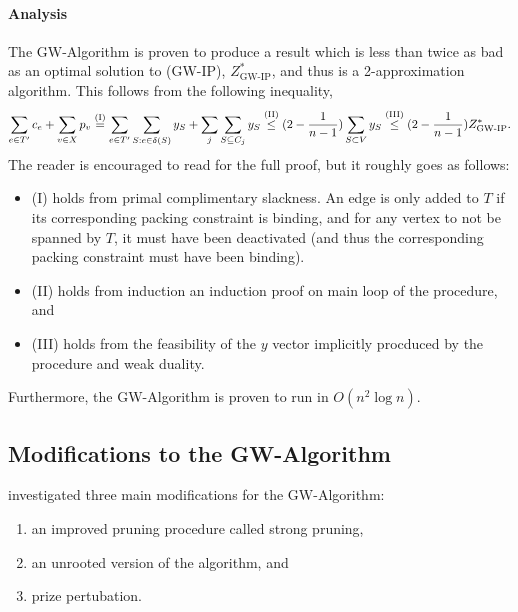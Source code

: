  \paragraph{Analysis}
 The GW-Algorithm is proven to produce a result which is less than twice as bad as an optimal solution to (GW-IP), $Z^*_{\text{GW-IP}}$, and thus
 is a 2-approximation algorithm. This follows from the following inequality,
 $$\sum_{e \in T'}c_e + \sum_{v \in X} p_v \overset{\text{(I)}}{=}   \sum_{e \in T'} \sum_{S: e \in \delta(S)} y_S  + \sum_{j} \sum_{S \subseteq C_j} y_S
 \overset{\text{(II)}}{\leq} (2 - \frac{1}{n-1}) \sum_{S \subset V} y_S \overset{\text{(III)}}{\leq} (2 - \frac{1}{n-1}) Z^*_{\text{GW-IP}}\mathnormal{.}$$
 The reader is encouraged to read \cite{goemans1997primal} for the full proof, but it roughly goes as follows:
 \begin{itemize}
 \item (I) holds from primal complimentary slackness. An edge is only added to $T$ if its corresponding packing constraint is binding,
   and for any vertex to not be spanned by $T$, it must have been deactivated (and thus the corresponding packing constraint must have
    been binding).
  \item (II) holds from induction an induction proof on main loop of the procedure, and
  \item (III) holds from the feasibility of the $y$ vector implicitly procduced by the procedure and weak duality.
 \end{itemize}
 Furthermore, the GW-Algorithm is proven to run in $O(n^2 \log n)$.
 \subsection{Modifications to the GW-Algorithm}\label{sec:approx:strongpruning}
 \cite{Johnson:2000:PCS:338219.338637} investigated three main modifications for the GW-Algorithm:
 \begin{enumerate}
 \item an improved pruning procedure called strong pruning,
 \item an unrooted version of the algorithm, and
 \item prize pertubation.
 \end{enumerate}
 
